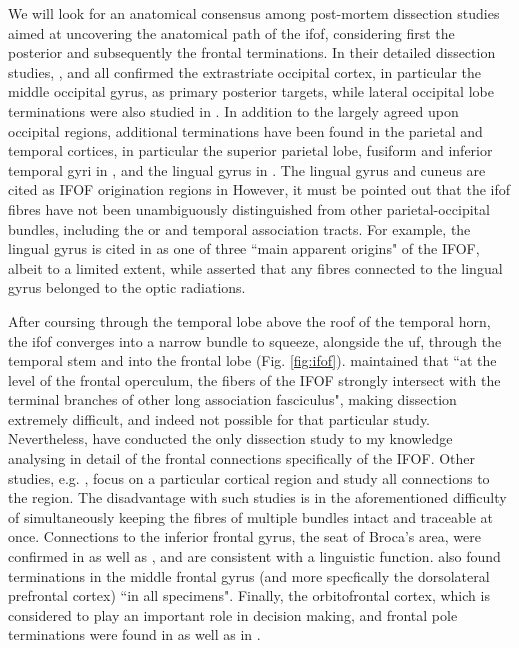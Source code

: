 We will look for an anatomical consensus among post-mortem dissection studies aimed at uncovering the anatomical path of the \gls{ifof}, considering first the posterior and subsequently the frontal terminations.
In their detailed dissection studies, \textcite{Martino2010}, and \textcite{Sarubbo2013} all confirmed the extrastriate occipital cortex, in particular the middle occipital gyrus, as primary posterior targets, while lateral occipital lobe terminations were also studied in \textcite{Palejwala2020}.
In addition to the largely agreed upon occipital regions, additional terminations have been found in the parietal and temporal cortices, in particular the superior parietal lobe, fusiform and inferior temporal gyri in \textcite{Martino2010}, and the lingual gyrus in \textcite{Sarubbo2013}.
The lingual gyrus and cuneus are cited as IFOF origination regions in \textcite{Palejwala2021}
However, it must be pointed out that the \gls{ifof} fibres have not been unambiguously distinguished from other parietal-occipital bundles, including the \gls{or} and temporal association tracts.
For example, the lingual gyrus is cited in \textcite{Sarubbo2013} as one of three ``main apparent origins" of the IFOF, albeit to a limited extent, while \textcite{Martino2010} asserted that any fibres connected to the lingual gyrus belonged to the optic radiations.

After coursing through the temporal lobe above the roof of the temporal horn,\autocite{Martino2010,Kljajevic2014a} the \gls{ifof} converges into a narrow bundle to squeeze, alongside the \gls{uf}, through the temporal stem and into the frontal lobe (Fig. \ref{fig:ifof}).\autocite{Martino2010,Sarubbo2013}
\textcite{Martino2010} maintained that ``at the level of the frontal operculum, the fibers of the IFOF strongly intersect with the terminal branches of other long association fasciculus", making dissection extremely difficult, and indeed not possible for that particular study.
Nevertheless, \textcite{Sarubbo2013} have conducted the only dissection study to my knowledge analysing in detail of the frontal connections specifically of the IFOF.
Other studies, e.g. \textcite{Burks2017}, focus on a particular cortical region and study all connections to the region.
The disadvantage with such studies is in the aforementioned difficulty of simultaneously keeping the fibres of multiple bundles intact and traceable at once.
Connections to the inferior frontal gyrus, the seat of Broca's area, were confirmed in \textcite{Sarubbo2013} as well as \textcite{Hau2016}, and are consistent with a linguistic function.
\textcite{Sarubbo2013} also found terminations in the middle frontal gyrus (and more specfically the dorsolateral prefrontal cortex) ``in all specimens".
Finally, the orbitofrontal cortex, which is considered to play an important role in decision making, and frontal pole terminations were found in \textcite{Sarubbo2013} as well as in \textcite{Burks2017}.

